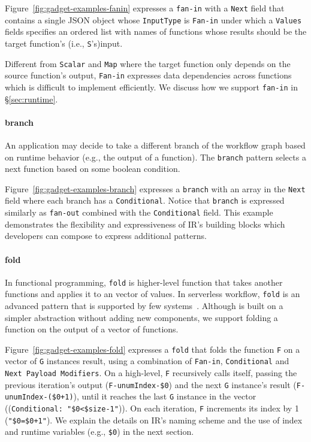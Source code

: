 Figure~\ref{fig:gadget-examples-fanin} expresses a \texttt{fan-in} with a
\texttt{Next} field that contains a single JSON object whose
\texttt{InputType} is \texttt{Fan-in} under which a \texttt{Values} fields
specifies an ordered list with names of functions whose results should be the
target function's (i.e., \texttt{S}'s)input.

Different from \texttt{Scalar} and \texttt{Map} where the target function only
depends on the source function's output, \texttt{Fan-in} expresses data
dependencies across functions which is difficult to implement efficiently. We
discuss how we support \texttt{fan-in} in \S\ref{sec:runtime}.

\paragraph{branch}

An application may decide to take a different branch of the workflow graph
based on runtime behavior (e.g., the output of a function). The
\texttt{branch} pattern selects a next function based on some boolean
condition.

Figure~\ref{fig:gadget-examples-branch} expresses a \texttt{branch} with an
array in the \texttt{Next} field where each branch has a \texttt{Conditional}.
Notice that \texttt{branch} is expressed similarly as \texttt{fan-out}
combined with the \texttt{Conditional} field. This example demonstrates the
flexibility and expressiveness of \name{} IR's building blocks which
developers can compose to express additional patterns.

\paragraph{fold}

In functional programming, \texttt{fold} is higher-level function that takes
another functions and applies it to an vector of values. In serverless
workflow, \texttt{fold} is an advanced pattern that is supported by few
systems~\cite{azure-functions}. Although \name{} is built on a simpler
abstraction without adding new components, we support folding a function on
the output of a vector of functions.

Figure~\ref{fig:gadget-examples-fold} expresses a \texttt{fold} that folds the
function \texttt{F} on a vector of \texttt{G} instances result, using a
combination of \texttt{Fan-in}, \texttt{Conditional} and \texttt{Next Payload
Modifiers}. On a high-level, \texttt{F} recursively calls itself, passing the
previous iteration's output (\texttt{F-unumIndex-\$0}) and the next \texttt{G}
instance's result (\texttt{F-unumIndex-(\$0+1)}), until it reaches the last
\texttt{G} instance in the vector ((\texttt{Conditional: "\$0<\$size-1"})). On
each iteration, \texttt{F} increments its index by 1 (\texttt{"\$0=\$0+1"}).
We explain the details on \name{} IR's naming scheme and the use of index and
runtime variables (e.g., \texttt{\$0}) in the next section.



